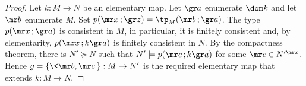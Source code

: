 \begin{proof}
Let $k:M\to N$ be an elementary map.
Let ${\gr a}$ enumerate $\dom k$ and let ${\mr b}$ enumerate $M$.
Set $p({\mr x}\,;{\gr z})=\tp_M({\mr b}\,;{\gr a})$.
The type $p({\mr x}\,;{\gr a})$ is consistent in $M$, in particular, it is finitely consistent and, by elementarity,  $p({\mr x}\,;k{\gr a})$ is finitely consistent in $N$.
By the compactness theorem, there is $N'\succeq N$ such that $N'\models p({\mr c}\,;k{\gr a})$ for some ${\mr c}\in N'^{\mr x}$.
Hence $g=\{\<{\mr b},{\mr c}\>\}:M\to N'$ is the required elementary map that extends $k:M\to N$.
\end{proof}
% 
% 
% 
% 
%    
% 


